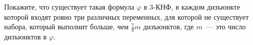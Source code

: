 Покажите, что существует такая формула $\varphi$ в $3$-КНФ, в каждом дизъюнкте которой входят ровно три
различных переменных, для которой не существует набора, который выполнит больше, чем $\frac{7}{8} m$
дизъюнктов, где $m$~--- это число дизъюнктов в $\varphi$.
